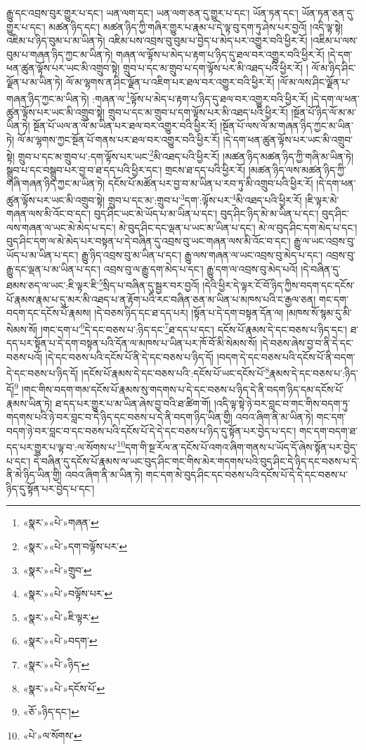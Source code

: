 རྒྱུ་དང་འབྲས་བུར་གྱུར་པ་དང་། ཡན་ལག་དང་། ཡན་ལག་ཅན་དུ་གྱུར་པ་དང་། ཡོན་ཏན་དང་། ཡོན་ཏན་ཅན་དུ་གྱུར་པ་དང་། མཚན་ཉིད་དང་། མཚན་ཉིད་ཀྱི་གཞིར་གྱུར་པ་རྣམ་པ་དེ་ལྟ་བུ་དག་ཏུ་ཤེས་པར་བྱའོ། །འདི་ལྟ་སྟེ། འཇིམ་པ་ཉིད་བུམ་པ་མ་ཡིན་ཏེ། འཇིམ་པས་འབྲས་བུ་བུམ་པ་བྱེད་པ་མེད་པར་འགྱུར་བའི་ཕྱིར་རོ། །འཇིམ་པ་ལས་བུམ་པ་གཞན་ཉིད་ཀྱང་མ་ཡིན་ཏེ། གཞན་ལ་ལྟོས་པ་མེད་པ་རྟག་པ་ཉིད་དུ་ཐལ་བར་འགྱུར་བའི་ཕྱིར་རོ། །དེ་དག་ཕན་ཚུན་ལྟོས་པར་ཡང་མི་འགྲུབ་སྟེ། གྲུབ་པ་དང་མ་གྲུབ་པ་དག་ལྟོས་པར་མི་འཐད་པའི་ཕྱིར་རོ། །
ལོ་མ་ཉིད་ཤིང་ལྗོན་པ་མ་ཡིན་ཏེ། ལོ་མ་ལྷགས་ན་ཤིང་ལྗོན་པ་འཇིག་པར་ཐལ་བར་འགྱུར་བའི་ཕྱིར་རོ། །ལོ་མ་ལས་ཤིང་ལྗོན་པ་གཞན་ཉིད་ཀྱང་མ་ཡིན་ཏེ། :གཞན་ལ་\footnote{«སྣར་»«པེ་»གཞན་}ལྟོས་པ་མེད་པ་རྟག་པ་ཉིད་དུ་ཐལ་བར་འགྱུར་བའི་ཕྱིར་རོ། །དེ་དག་ལ་ཕན་ཚུན་ལྟོས་པར་ཡང་མི་འགྲུབ་སྟེ། གྲུབ་པ་དང་མ་གྲུབ་པ་དག་ལྟོས་པར་མི་འཐད་པའི་ཕྱིར་རོ། །སྔོན་པོ་ཉིད་ལོ་མ་མ་ཡིན་ཏེ། སྔོན་པོ་ཡལ་ན་ལོ་མ་ཡིན་པར་ཐལ་བར་འགྱུར་བའི་ཕྱིར་རོ། །སྔོན་པོ་ལས་ལོ་མ་གཞན་ཉིད་ཀྱང་མ་ཡིན་ཏེ། ལོ་མ་ལྷགས་ཀྱང་སྔོན་པོ་གནས་པར་ཐལ་བར་འགྱུར་བའི་ཕྱིར་རོ། །དེ་དག་ཕན་ཚུན་ལྟོས་པར་ཡང་མི་འགྲུབ་སྟེ། གྲུབ་པ་དང་མ་གྲུབ་པ་:དག་ལྟོས་པར་ཡང་\footnote{«སྣར་»«པེ་»དག་བལྟོས་པར་}མི་འཐད་པའི་ཕྱིར་རོ། །མཚན་ཉིད་མཚན་ཉིད་ཀྱི་གཞི་མ་ཡིན་ཏེ། སྒྲུབ་པ་དང་བསྒྲུབ་པར་བྱ་བ་ཐ་དད་པའི་ཕྱིར་དང་། གྲངས་ཐ་དད་པའི་ཕྱིར་རོ། །མཚན་ཉིད་ལས་མཚན་ཉིད་ཀྱི་གཞི་གཞན་ཉིད་ཀྱང་མ་ཡིན་ཏེ། དངོས་པོ་མཚོན་པར་བྱ་བ་མ་ཡིན་པ་རབ་ཏུ་མི་འགྲུབ་པའི་ཕྱིར་རོ། །དེ་དག་ཕན་ཚུན་ལྟོས་པར་ཡང་མི་འགྲུབ་སྟེ། གྲུབ་པ་དང་མ་:གྲུབ་པ་\footnote{«སྣར་»«པེ་»གྲུབ་}དག་:ལྟོས་པར་\footnote{«སྣར་»«པེ་»བལྟོས་པར་}མི་འཐད་པའི་ཕྱིར་རོ། །ཇི་ལྟར་མེ་གཞན་ལས་མི་འོང་བ་དང་། བུད་ཤིང་ཡང་མེ་ཡོད་པ་མ་ཡིན་པ་དང་། བུད་ཤིང་ཉིད་མེ་མ་ཡིན་པ་དང་། བུད་ཤིང་ལས་གཞན་ལ་ཡང་མེ་མེད་པ་དང་། མེ་བུད་ཤིང་དང་ལྡན་པ་ཡང་མ་ཡིན་པ་དང་། མེ་ལ་བུད་ཤིང་དག་མེད་པ་དང་། བུད་ཤིང་དག་ལ་མེ་མེད་པར་བསྟན་པ་དེ་བཞིན་དུ་འབྲས་བུ་ཡང་གཞན་ལས་མི་འོང་བ་དང་། རྒྱུ་ལ་ཡང་འབྲས་བུ་ཡོད་པ་མ་ཡིན་པ་དང་། རྒྱུ་ཉིད་འབྲས་བུ་མ་ཡིན་པ་དང་། རྒྱུ་ལས་གཞན་ལ་ཡང་འབྲས་བུ་མེད་པ་དང་། འབྲས་བུ་རྒྱུ་དང་ལྡན་པ་མ་ཡིན་པ་དང་། འབྲས་བུ་ལ་རྒྱུ་དག་མེད་པ་དང་། རྒྱུ་དག་ལ་འབྲས་བུ་མེད་པའོ། །དེ་བཞིན་དུ་ཐམས་ཅད་ལ་ཡང་:ཇི་ལྟར་ཇི་\footnote{«སྣར་»«པེ་»ཇི་ལྟར་}སྲིད་པ་བཞིན་དུ་སྦྱར་བར་བྱའོ། །དེའི་ཕྱིར་དེ་ལྟར་ངོ་བོ་ཉིད་ཀྱིས་བདག་དང་དངོས་པོ་རྣམས་རྣམ་པ་དུ་མར་མི་འཐད་པ་ན་རྟོག་པའི་རང་བཞིན་ཅན་མ་ཡིན་པ་མཁས་པའི་ང་རྒྱལ་ཅན། གང་དག་བདག་དང་དངོས་པོ་རྣམས། །དེ་བཅས་ཉིད་དང་ཐ་དད་པར། །སྟོན་པ་དེ་དག་བསྟན་དོན་ལ། །མཁས་སོ་སྙམ་དུ་མི་སེམས་སོ། །གང་དག་པ་\footnote{«སྣར་»«པེ་»བདག་}དེ་དང་བཅས་པ་:ཉིད་དང་\footnote{«སྣར་»«པེ་»ཉིད་}ཐ་དད་པ་དང་། དངོས་པོ་རྣམས་དེ་དང་བཅས་པ་ཉིད་དང་། ཐ་དད་པར་སྟོན་པ་དེ་དག་བསྟན་པའི་དོན་ལ་མཁས་པ་ཡིན་པར་ཁོ་བོ་མི་སེམས་སོ། །དེ་བཅས་ཞེས་བྱ་བ་ནི་དེ་དང་བཅས་པའོ། །དེ་དང་བཅས་པའི་དངོས་པོ་ནི་དེ་དང་བཅས་པ་ཉིད་དོ། །བདག་དེ་དང་བཅས་པའི་དངོས་པོ་ནི་བདག་དེ་དང་བཅས་པ་ཉིད་དོ། །དངོས་པོ་རྣམས་དེ་དང་བཅས་པའི་:དངོས་པོ་ཡང་དངོས་པོ་\footnote{«སྣར་»«པེ་»དངོས་པོ་}རྣམས་དེ་དང་བཅས་པ་:ཉིད་དོ།\footnote{«ཅོ་»ཉིད་དང་།} །གང་གིས་བདག་གམ་དངོས་པོ་རྣམས་སུ་གདགས་པ་དེ་དང་བཅས་པ་ཉིད་དེ་ནི་བདག་ཉིད་དམ་དངོས་པོ་རྣམས་ཡིན་ཏེ། ཐ་དད་པར་གྱུར་པ་མ་ཡིན་ཞེས་བྱ་བའི་ཐ་ཚིག་གོ། །འདི་ལྟ་སྟེ་ཉེ་བར་བླང་བ་གང་གིས་བདག་ཏུ་གདགས་པའི་ཉེ་བར་བླང་བ་དེ་ཉིད་དང་བཅས་པ་དེ་ནི་བདག་ཉིད་ཡིན་གྱི། འབའ་ཞིག་ནི་མ་ཡིན་ཏེ། གང་དག་བདག་ཉེ་བར་བླང་བ་དང་བཅས་པའི་དངོས་པོ་དེ་དེ་དང་བཅས་པ་ཉིད་དུ་སྟོན་པར་བྱེད་པ་དང་། གང་དག་བདག་ཐ་དད་པར་གྱུར་པ་ལྟ་བ་:ལ་སོགས་པ་\footnote{«པེ་»ལ་སོགས་}དག་གི་སྔ་རོལ་ན་དངོས་པོ་འགའ་ཞིག་གནས་པ་ཡོད་དོ་ཞེས་སྟོན་པར་བྱེད་པ་དང་། དེ་བཞིན་དུ་དངོས་པོ་རྣམས་ལ་ཡང་བུད་ཤིང་གང་གིས་མེར་གདགས་པའི་བུད་ཤིང་དེ་ཉིད་དང་བཅས་པ་དེ་ནི་མེ་ཉིད་ཡིན་གྱི། འབའ་ཞིག་ནི་མ་ཡིན་ཏེ། གང་དག་མེ་བུད་ཤིང་དང་བཅས་པའི་དངོས་པོ་དེ་དེ་དང་བཅས་པ་ཉིད་དུ་སྟོན་པར་བྱེད་པ་དང་། 